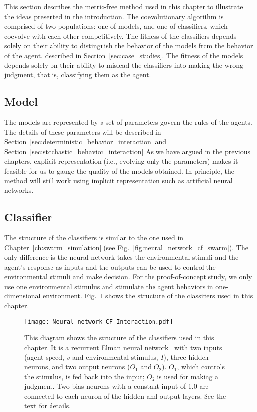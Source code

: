 This section describes the metric-free method used in this chapter to illustrate the ideas presented in the introduction. The coevolutionary algorithm is comprised of two populations: one of models, and one of classifiers, which coevolve with each other competitively. The fitness of the classifiers depends solely on their ability to distinguish the behavior of the models from the behavior of the agent, described in Section~\ref{sec:case_studies}. The fitness of the models depends solely on their ability to mislead the classifiers into making the wrong judgment, that is, classifying them as the agent.

\subsection{Model} 

The models are represented by a set of parameters govern the rules of the agents. The details of these parameters will be described in Section~\ref{sec:deterministic_behavior_interaction} and Section~\ref{sec:stochastic_behavior_interaction} As we have argued in the previous chapters, explicit representation (i.e., evolving only the parameters) makes it feasible for us to gauge the quality of the models obtained. In principle, the method will still work using implicit representation such as artificial neural networks. 

\subsection{Classifier}

The structure of the classifiers is similar to the one used in Chapter~\ref{ch:swarm_simulation} (see Fig.~\ref{fig:neural_network_cf_swarm}). The only difference is the neural network takes the environmental stimuli and the agent's response as inputs and the outputs can be used to control the environmental stimuli and make decision. For the proof-of-concept study, we only use one environmental stimulus and stimulate the agent behaviors in one-dimensional environment.
Fig.~\ref{fig:neural_network_interaction} shows the structure of the classifiers used in this chapter. 

\begin{figure}[!t]
    \centering
    \texttt{[image: Neural\_network\_CF\_Interaction.pdf]}
    \caption{This diagram shows the structure of the classifiers used in this chapter. It is a recurrent Elman neural network~\cite{Elman1990} with two inputs (agent speed, $v$ and environmental stimulus, $I$), three hidden neurons, and two output neurons ($O_1$ and $O_2$). $O_1$, which controls the stimulus, is fed back into the input; $O_2$ is used for making a judgment. Two bias neurons with a constant input of 1.0 are connected to each neuron of the hidden and output layers. See the text for details.}
    \label{fig:neural_network_interaction}
\end{figure}

